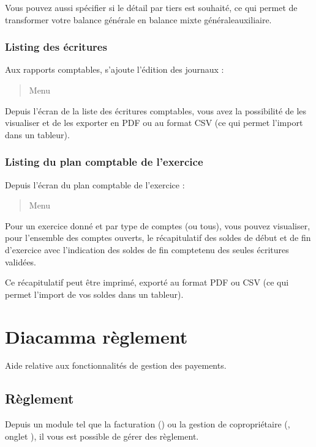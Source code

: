 \documentclass[a4paper,10pt,oneside,french]{sphinxmanual}
\begin{document}
Vous pouvez aussi spécifier si le détail par tiers est souhaité, ce qui permet de transformer votre balance générale en balance mixte générale\sphinxhyphen{}auxiliaire.


\subsection{Listing des écritures}
\label{\detokenize{accounting/reporting:listing-des-ecritures}}
Aux rapports comptables, s’ajoute l’édition des journaux :
\begin{quote}

Menu 
\end{quote}

Depuis l’écran de la liste des écritures comptables, vous avez la possibilité de les visualiser et de les exporter en PDF ou  au format CSV (ce qui permet l’import dans un tableur).


\subsection{Listing du plan comptable de l’exercice}
\label{\detokenize{accounting/reporting:listing-du-plan-comptable-de-l-exercice}}
Depuis l’écran du plan comptable de l’exercice :
\begin{quote}

Menu 
\end{quote}

Pour un exercice donné et par type de comptes (ou tous), vous pouvez visualiser, pour l’ensemble des comptes ouverts, le récapitulatif des soldes de début et de fin d’exercice avec l’indication des soldes de fin compte\sphinxhyphen{}tenu des seules écritures validées.

Ce récapitulatif peut être imprimé, exporté au format PDF ou CSV (ce qui permet l’import de vos soldes dans un tableur).


\chapter{Diacamma règlement}
\label{\detokenize{payoff/index:diacamma-reglement}}\label{\detokenize{payoff/index::doc}}
Aide relative aux fonctionnalités de gestion des payements.


\section{Règlement}
\label{\detokenize{payoff/payoff:reglement}}\label{\detokenize{payoff/payoff::doc}}
Depuis un module tel que la facturation () ou la gestion de copropriétaire (, onglet ), il vous est possible de gérer des règlement.
\end{document}
